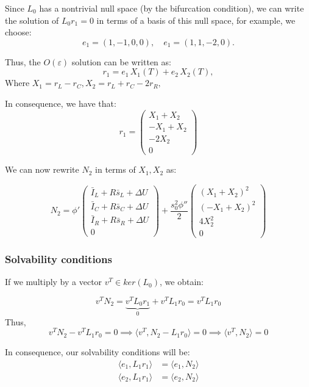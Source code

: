\documentclass[ENG]{fancynotes}
\begin{document}
Since \(L_0\) has a nontrivial null space (by the bifurcation condition), we can write the solution of $L_0r_1 = 0$  in terms of a basis of this null space, for example, we choose:
\[
e_1 = (1, -1, 0, 0), \quad e_1 = (1, 1, -2, 0).
\]

Thus, the $O(\varepsilon)$ solution can be written as:
\[
r_1 = e_1\,X_1(T) + e_2\,X_2(T),
\]
Where $X_1 = r_L-r_C, X_2 =  r_L+r_C-2r_R, $

In consequence, we have that:
 \[
r_{1} = \begin{pmatrix}X_1+X_2\\-X_1+X_2\\-2X_2\\0 \end{pmatrix} 
\]


We can now rewrite $N_2$ in terms of $X_1, X_2$ as:

\[
N_2 = \phi'\begin{pmatrix}
\bar{I}_L + R\bar{s}_L +\Delta U  \\\bar{I}_C  + R\bar{s}_C +\Delta U\\ 
\bar{I}_R + R\bar{s}_R +\Delta U\\ 
0
\end{pmatrix} + \frac{s_0^2 \phi''}{2} 
\begin{pmatrix}
(X_1 +X_2)^2\\  
(-X_1 + X_2)^2\\  
4X_2^2\\ 
0
\end{pmatrix}
\]

\subsubsection{Solvability conditions}
If we multiply by a vector  $v^T  \in ker(L_0)$, we obtain:

$$
v^T N_2 = \underbrace{v^T L_0 r_1}_0 + v^T L_1 r_0 = v^T L_1 r_0
$$
Thus, 
$$
v^T N_2 - v^T L_1 r_0 = 0 \implies \langle v^T,  N_2 - L_1 r_0\rangle = 0 \implies \langle v^T,  N_2 \rangle = 0 
$$

In consequence, our solvability conditions will be:
\begin{equation}
\begin{aligned}
    \langle e_1, L_1 r_1 \rangle &= \langle e_1, N_2 \rangle \\
    \langle e_2, L_1 r_1 \rangle &= \langle e_2, N_2 \rangle
\end{aligned}
 \label{eq:solvability1}
\end{equation}
\end{document}
